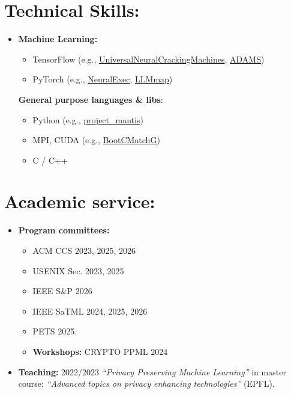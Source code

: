 \documentclass[margin, 10pt]{article} %
\begin{document}
\section*{Technical Skills:}
\fi 
\begin{itemize}
	\item  \textbf{Machine Learning:} 
	\begin{itemize}
		\item TensorFlow (e.g., \href{https://github.com/TheAdamProject/UniversalNeuralCrackingMachines}{UniversalNeuralCrackingMachines}, \href{https://github.com/TheAdamProject/adams}{ADAMS})%
		\item PyTorch (e.g., \href{https://github.com/pasquini-dario/LLM_NeuralExec}{NeuralExec},  \href{https://github.com/pasquini-dario/LLMmap}{LLMmap})
	\end{itemize}
	
	\textbf{General purpose languages \& libs}:
	\begin{itemize}
		\item Python (e.g., \href{https://github.com/pasquini-dario/project_mantis/}{project\_mantis})
		\item MPI, CUDA (e.g., \href{https://github.com/bootcmatch/BootCMatchG/}{BootCMatchG})
		\item  C / C++
	\end{itemize}
	
\end{itemize}

\noindent\makebox[\linewidth]{\rule{.2\paperwidth}{0.3pt}}
\section*{Academic service:}  
\begin{itemize}
	\item \textbf{Program committees:}
	\begin{itemize}
		\item ACM CCS 2023, 2025, 2026
		\item USENIX Sec. 2023, 2025
		\item IEEE S\&P 2026
		\item IEEE SaTML 2024, 2025, 2026
		\item PETS 2025.
	\end{itemize} 
	\begin{itemize}
		\item \textbf{Workshops:} CRYPTO PPML 2024
	\end{itemize}
	\item \textbf{Teaching:} 2022/2023 \textit{``Privacy Preserving Machine Learning''} in  master course: \textit{``Advanced topics on privacy enhancing technologies''} (EPFL).
\end{itemize}
\end{document}
